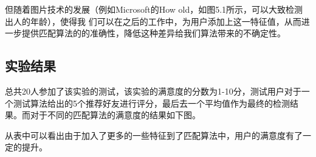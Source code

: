 但随着图片技术的发展（例如Microsoft的How old，如图5.1所示，可以大致检测出人的年龄），使得我	们可以在之后的工作中，为用户添加上这一特征值，从而进一步提供匹配算法的的准确性，降低这种差异给我们算法带来的不确定性。

\subsection{实验结果}
总共20人参加了该实验的测试，该实验的满意度的分数为1-10分，测试用户对于一个测试算法给出的5个推荐好友进行评分，最后去一个平均值作为最终的检测结果。而对于不同的匹配算法的满意度的结果如下图。

从表中可以看出由于加入了更多的一些特征到了匹配算法中，用户的满意度有了一定的提升。



